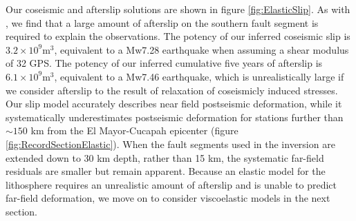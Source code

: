 \documentclass[1p]{elsarticle}
\begin{document}
Our coseismic and afterslip solutions are shown in figure \ref{fig:ElasticSlip}.  As with \citet{Rollins2015}, we find that a large amount of afterslip on the southern fault segment is required to explain the observations. The potency of our inferred coseismic slip is $3.2\times10^9 \mathrm{m}^3$, equivalent to a Mw7.28 earthquake when assuming a shear modulus of 32 GPS.  The potency of our inferred cumulative five years of afterslip is $6.1\times10^9 \mathrm{m}^3$, equivalent to a Mw7.46 earthquake, which is unrealistically large if we consider afterslip to the result of relaxation of coseismicly induced stresses.  Our slip model accurately describes near field postseismic deformation, while it systematically underestimates postseismic deformation for stations further than $\sim150$ km from the El Mayor-Cucapah epicenter (figure \ref{fig:RecordSectionElastic}).  When the fault segments used in the inversion are extended down to 30 km depth, rather than 15 km, the systematic far-field residuals are smaller but remain apparent. Because an elastic model for the lithosphere requires an unrealistic amount of afterslip and is unable to predict far-field deformation, we move on to consider viscoelastic models in the next section.  
\end{document}
